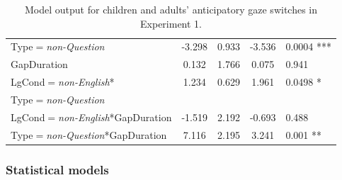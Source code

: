 \documentclass[authoryear, 12pt]{elsarticle}
\begin{document}
\begin{table}[h!]
\begin{small}
\begin{center}
\begin{tabular}{lcccl}
    Type$=$\textit{non-Question}							& -3.298   & 0.933 & -3.536 & 0.0004 ***	\\
    GapDuration														&  0.132   & 1.766 &  0.075 & 0.941			\\ 
    LgCond$=$\textit{non-English}*						&  1.234   & 0.629 &  1.961 & 0.0498 *		\\
    \hspace*{5mm} Type$=$\textit{non-Question} &&&& \\
    LgCond$=$\textit{non-English}*GapDuration		& -1.519   & 2.192 & -0.693 & 0.488			\\
    Type$=$\textit{non-Question}*GapDuration			&  7.116   & 2.195 &  3.241 & 0.001 **		\\
    \hline
  \end{tabular}
\end{center}
  \end{small}
  \caption{Model output for children and adults' anticipatory gaze switches in Experiment 1.}
\label{tab:E1-models}
\end{table}

\subsubsection*{Statistical models}
\label{sec:models1}
\end{document}
